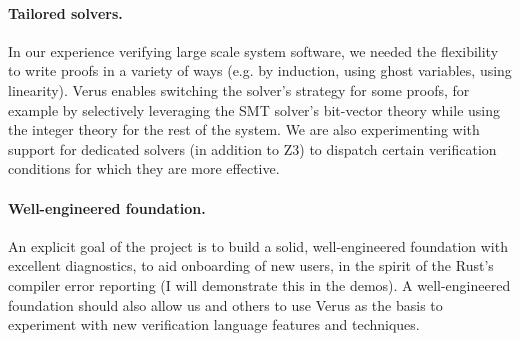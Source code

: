 \documentclass[11pt,twocolumn]{article}
\renewcommand{\section}[1]{\paragraph{#1.}}
\begin{document}
\section{Tailored solvers}

In our experience verifying large scale system software, we needed
the flexibility to write proofs in a variety of ways (e.g. by induction,
using ghost variables, using linearity). Verus enables
switching the solver's strategy for some proofs, for example by
selectively leveraging the SMT solver's bit-vector theory
while using the integer theory for the rest of the system.
We are also experimenting with support for dedicated solvers
(in addition to Z3) to dispatch certain verification conditions
for which they are more effective.
\section{Well-engineered foundation}

An explicit goal of the project is to build a solid, well-engineered
foundation with excellent diagnostics, to aid onboarding of new users,
in the spirit of the Rust's compiler error reporting (I will demonstrate
this in the demos). A well-engineered foundation should also allow us
and others to use Verus as the basis to experiment with new verification
language features and techniques.
\end{document}
